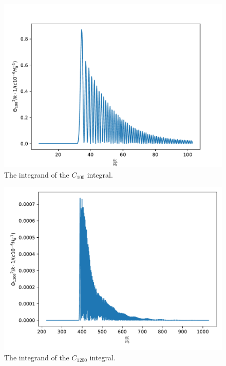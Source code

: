 \documentclass{aa}
\begin{document}
\begin{figure}[h!]
   \includegraphics[scale=0.6]{../figures/milestone4/theta_100_squared.pdf}
   \caption{The integrand of the $C_{100}$ integral.}\label{fig:m4_theta100_squared}
\end{figure}

\begin{figure}[h!]
   \hspace{-1cm}
   \includegraphics[scale=0.6]{../figures/milestone4/theta_1200_squared.pdf}
   \caption{The integrand of the $C_{1200}$ integral.}\label{fig:m4_theta1200_squared}
\end{figure}
\end{document}
